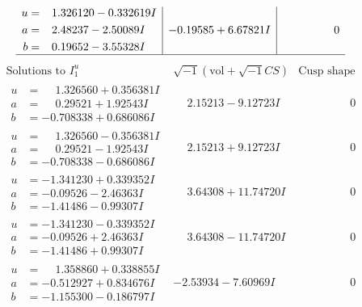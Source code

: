 \documentclass[1p]{elsarticle_modified}
\theoremstyle{definition}
\newcommand{\I}{\sqrt{-1}}
\begin{document}
$$\begin{array}{c|c|c}
\begin{aligned}
u &= \phantom{-}1.326120 - 0.332619 I \\
a &= \phantom{-}2.48237 - 2.50089 I \\
b &= \phantom{-}0.19652 - 3.55328 I\end{aligned}
 & -0.19585 + 6.67821 I & \phantom{-0.000000 } 0\\
 \hline 
 \end{array}$$\newpage$$\begin{array}{c|c|c}  
\text{Solutions to }I^u_{1}& \I (\text{vol} + \sqrt{-1}CS) & \text{Cusp shape}\\
 \hline 
\begin{aligned}
u &= \phantom{-}1.326560 + 0.356381 I \\
a &= \phantom{-}0.29521 + 1.92543 I \\
b &= -0.708338 + 0.686086 I\end{aligned}
 & \phantom{-}2.15213 - 9.12723 I & \phantom{-0.000000 } 0 \\ \hline\begin{aligned}
u &= \phantom{-}1.326560 - 0.356381 I \\
a &= \phantom{-}0.29521 - 1.92543 I \\
b &= -0.708338 - 0.686086 I\end{aligned}
 & \phantom{-}2.15213 + 9.12723 I & \phantom{-0.000000 } 0 \\ \hline\begin{aligned}
u &= -1.341230 + 0.339352 I \\
a &= -0.09526 - 2.46363 I \\
b &= -1.41486 - 0.99307 I\end{aligned}
 & \phantom{-}3.64308 + 11.74720 I & \phantom{-0.000000 } 0 \\ \hline\begin{aligned}
u &= -1.341230 - 0.339352 I \\
a &= -0.09526 + 2.46363 I \\
b &= -1.41486 + 0.99307 I\end{aligned}
 & \phantom{-}3.64308 - 11.74720 I & \phantom{-0.000000 } 0 \\ \hline\begin{aligned}
u &= \phantom{-}1.358860 + 0.338855 I \\
a &= -0.512927 + 0.834676 I \\
b &= -1.155300 - 0.186797 I\end{aligned}
 & -2.53934 - 7.60969 I & \phantom{-0.000000 } 0 \\ \hline\begin{aligned}

\end{aligned}
\end{array}$$
\end{document}
